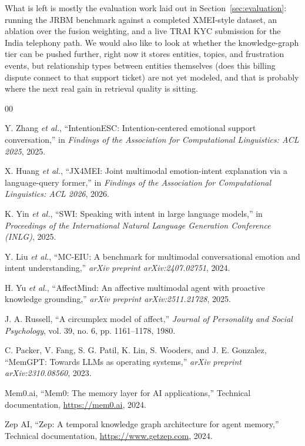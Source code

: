 \documentclass[conference]{IEEEtran}
\begin{document}
What is left is mostly the evaluation work laid out in Section~\ref{sec:evaluation}: running the JRBM benchmark against a completed XMEI-style dataset, an ablation over the fusion weighting, and a live TRAI KYC submission for the India telephony path. We would also like to look at whether the knowledge-graph tier can be pushed further, right now it stores entities, topics, and frustration events, but relationship types between entities themselves (does this billing dispute connect to that support ticket) are not yet modeled, and that is probably where the next real gain in retrieval quality is sitting.

\begin{thebibliography}{00}
\setlength{\itemsep}{1pt plus 1pt}

 Y. Zhang \emph{et al.}, ``IntentionESC: Intention-centered emotional support conversation,'' in \emph{Findings of the Association for Computational Linguistics: ACL 2025}, 2025.

 X. Huang \emph{et al.}, ``JX4MEI: Joint multimodal emotion-intent explanation via a language-query former,'' in \emph{Findings of the Association for Computational Linguistics: ACL 2026}, 2026.

 K. Yin \emph{et al.}, ``SWI: Speaking with intent in large language models,'' in \emph{Proceedings of the International Natural Language Generation Conference (INLG)}, 2025.

 Y. Liu \emph{et al.}, ``MC-EIU: A benchmark for multimodal conversational emotion and intent understanding,'' \emph{arXiv preprint arXiv:2407.02751}, 2024.

 H. Yu \emph{et al.}, ``AffectMind: An affective multimodal agent with proactive knowledge grounding,'' \emph{arXiv preprint arXiv:2511.21728}, 2025.

 J. A. Russell, ``A circumplex model of affect,'' \emph{Journal of Personality and Social Psychology}, vol. 39, no. 6, pp. 1161--1178, 1980.

 C. Packer, V. Fang, S. G. Patil, K. Lin, S. Wooders, and J. E. Gonzalez, ``MemGPT: Towards LLMs as operating systems,'' \emph{arXiv preprint arXiv:2310.08560}, 2023.

 Mem0.ai, ``Mem0: The memory layer for AI applications,'' Technical documentation, \url{https://mem0.ai}, 2024.

 Zep AI, ``Zep: A temporal knowledge graph architecture for agent memory,'' Technical documentation, \url{https://www.getzep.com}, 2024.

\end{thebibliography}
\end{document}
